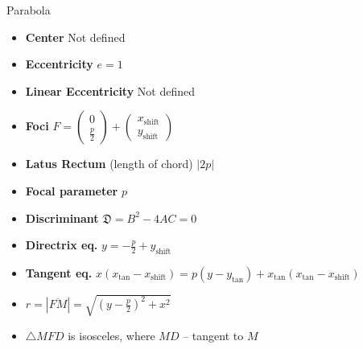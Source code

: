 \documentclass[aspectratio=169]{beamer}
\newcommand{\shf}{\text{shift}}
\begin{document}
\begin{frame}[t]{Parabola}
\begin{multicols}{3}
\begin{itemize}
            \item \textbf{Center} Not defined
            \item \textbf{Eccentricity} $e = 1$
            \item \textbf{Linear Eccentricity} Not defined
            \item \textbf{Foci} $F = \begin{pmatrix} 0\\\frac{p}{2} \end{pmatrix} + \begin{pmatrix} x_{\shf}\\y_{\shf} \end{pmatrix}$
            \item \textbf{Latus Rectum} (length of chord) $|2p|$
            \item \textbf{Focal parameter}  $p$
            \item \textbf{Discriminant} $\mathfrak{D} = B^2 - 4AC = 0$
            \item \textbf{Directrix eq.} $y = -\frac{p}{2} + y_{\shf}$
            \item \textbf{Tangent eq.}  $x(x_{\text{tan}}-x_{\shf})=p(y-y_{\text{tan}})+x_{\text{tan}}(x_{\text{tan}}-x_{\shf})$
            \item $r = |\overline{FM}|=\sqrt{(y-\frac{p}{2})^2+x^2}$
            \item $\triangle MFD$ is isosceles, where $MD$ -- tangent to $M$
            \end{itemize}
    \end{multicols}
    \end{frame}
\end{document}

